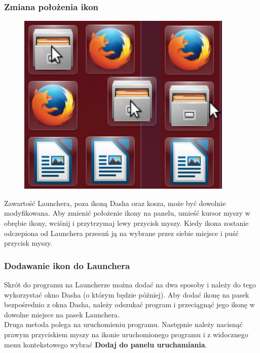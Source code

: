 \subsubsection{Zmiana położenia ikon}
\begin{figure}
                \includegraphics[width=\linewidth]{images/unity_launcher_zmiana_polozenia_ikon.png}
\end{figure}

Zawartość Launchera, poza ikoną Dasha oraz kosza, może być dowolnie modyfikowana. Aby zmienić położenie ikony na panelu, umieść kursor myszy w obrębie ikony, wciśnij i przytrzymaj lewy przycisk myszy. Kiedy ikona zostanie odczepiona od Launchera przesuń ją na wybrane przez siebie miejsce i puść przycisk myszy.

\subsubsection{Dodawanie ikon do Launchera}
Skrót do programu na Launcherze można dodać na dwa sposoby i należy do tego wykorzystać okno Dasha (o którym będzie później). Aby dodać ikonę na pasek bezpośrednio z okna Dasha, należy odszukać program i przeciągnąć jego ikonę w dowolne miejsce na pasek Launchera.\\
Druga metoda polega na uruchomieniu programu. Następnie należy nacisnąć prawym przyciskiem myszy na ikonie uruchomionego programu i z widocznego menu kontekstowego wybrać \textbf{Dodaj do panelu uruchamiania}.

